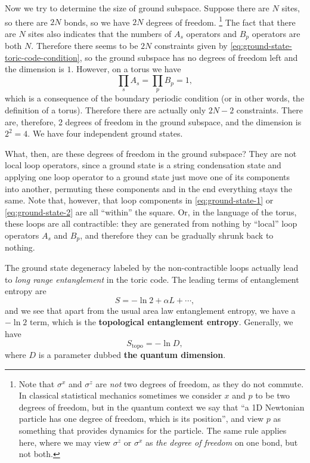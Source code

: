 \documentclass[hyperref, a4paper]{article}
\newcommand*{\concept}[1]{{\textbf{#1}}}
\begin{document}
Now we try to determine the size of ground subspace. 
Suppose there are $N$ sites, so there are $2N$ bonds, so we have $2N$ degrees of freedom.%
\footnote{
    Note that $\sigma^x$ and $\sigma^z$ are \emph{not} two degrees of freedom, as they do not commute.
    In classical statistical mechanics sometimes we consider $x$ and $p$ to be two degrees of freedom, but in the quantum context we say that ``a 1D Newtonian particle has one degree of freedom, which is its position'', and view $p$ as something that provides dynamics for the particle.
    The same rule applies here, where we may view $\sigma^z$ or $\sigma^x$ as \emph{the degree of freedom} on one bond, but not both.
}
The fact that there are $N$ sites also indicates that the numbers of $A_s$ operators and $B_p$ operators are both $N$.
Therefore there seems to be $2N$ constraints given by \eqref{eq:ground-state-toric-code-condition}, 
so the ground subspace has no degrees of freedom left and the dimension is $1$.
However, on a torus we have 
\[
    \prod_s A_s = \prod_p B_p = 1,
\]
which is a consequence of the boundary periodic condition (or in other words, the definition of a torus).
Therefore there are actually only $2N - 2$ constraints.
There are, therefore, 2 degrees of freedom in the ground subspace, and the dimension is $2^2 = 4$.
We have four independent ground states.

What, then, are these degrees of freedom in the ground subspace? 
They are not local loop operators, since a ground state is a string condensation state and applying one loop operator to a ground state just move one of its components into another, permuting these components and in the end everything stays the same.
Note that, however, that loop components in \eqref{eq:ground-state-1} or \eqref{eq:ground-state-2} are all ``within'' the square.
Or, in the language of the torus, these loops are all contractible: they are generated from nothing by ``local'' loop operators $A_s$ and $B_p$, and therefore they can be gradually shrunk back to nothing.

The ground state degeneracy labeled by the non-contractible loops actually lead to \emph{long range entanglement} in the toric code. 
The leading terms of entanglement entropy are
\begin{equation}
    S = - \ln 2 + \alpha L + \cdots,
\end{equation}
and we see that apart from the usual area law entanglement entropy, we have a $- \ln 2$ term, which is the \concept{topological entanglement entropy}.
Generally, we have 
\begin{equation}
    S_\text{topo} = - \ln D,
\end{equation}
where $D$ is a parameter dubbed \concept{the quantum dimension}.
\end{document}
